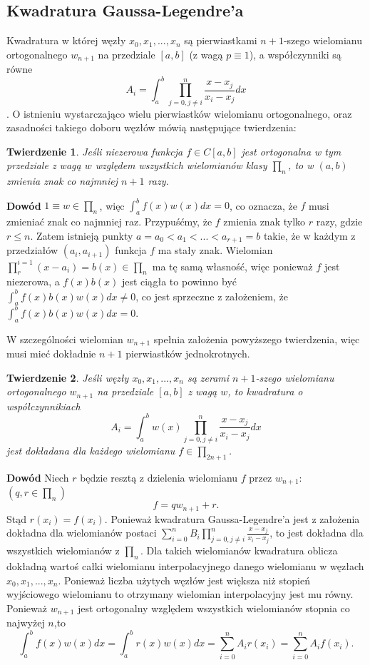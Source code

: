 \documentclass{article}
\newtheorem{theorem}{Twierdzenie}
\begin{document}
\subsection*{Kwadratura Gaussa-Legendre'a}
Kwadratura w której węzły $x_0,x_1,...,x_n$ są pierwiastkami $n+1$-szego
wielomianu ortogonalnego $w_{n+1}$ na przedziale $[a,b]$ (z wagą $p\equiv 1$), a współczynniki są równe
\[A_i=\int_a^b \prod_{j=0,j\neq i}^n \frac{x-x_j}{x_i-x_j} dx\]. O istnieniu
wystarczająco wielu pierwiastków wielomianu ortogonalnego, oraz zasadności 
takiego doboru węzłów mówią następujące twierdzenia: 
\begin{theorem}
	Jeśli niezerowa funkcja $f\in C[a,b]$ jest ortogonalna w tym przedziale z wagą $w$ względem wszystkich wielomianów klasy $\prod_{n}$, to w $(a,b)$ zmienia znak co najmniej $n+1$ razy.
\end{theorem}
\textbf{Dowód} $1\equiv w \in \prod_{n}$, więc $\int_a^b f(x)w(x)dx = 0$, co oznacza, że $f$ musi zmieniać znak co najmniej raz. Przypuśćmy, że $f$ zmienia znak tylko $r$ razy, gdzie $r\le n $. Zatem istnieją punkty $a=a_0<a_1<...<a_{r+1}=b$ takie, że w każdym z przedziałów $(a_i,a_{i+1})$ funkcja $f$ ma stały znak. Wielomian $\prod_{r}^{i=1}(x-a_i) = b(x) \in \prod_{n}$ ma tę samą własność, więc ponieważ $f$ jest niezerowa, a $f(x)b(x)$ jest ciągła to powinno być $\int_{a}^{b} f(x)b(x)w(x)dx\neq 0$, co jest sprzeczne z założeniem, że $\int_{a}^{b}f(x)b(x)w(x)dx = 0$. \newline

W szczególności wielomian $w_{n+1}$ spełnia założenia powyższego twierdzenia, więc musi mieć dokładnie $n+1$ pierwiastków jednokrotnych.

\begin{theorem}
	Jeśli węzły $x_0,x_1,...,x_n$ są zerami $n+1$-szego wielomianu ortogonalnego $w_{n+1}$ na przedziale $[a,b]$ z wagą $w$, to kwadratura o współczynnikiach
	\[A_i=\int_a^b w(x)\prod_{j=0,j\neq i}^n \frac{x-x_j}{x_i-x_j} dx\] jest dokładana dla każdego wielomianu $f\in\prod_{2n+1}$.
\end{theorem}

\textbf{Dowód} Niech $r$ będzie resztą z dzielenia wielomianu $f$ przez $w_{n+1}$: $(q,r\in \prod_{n})$\[f = qw_{n+1} + r .\] Stąd $r(x_i) = f(x_i)$. Ponieważ kwadratura Gaussa-Legendre'a jest z założenia dokładna dla wielomianów postaci $\sum_{i=0}^n B_i\prod_{j=0,j\neq i}^n \frac{x-x_j}{x_i-x_j}$, to jest dokładna dla wszystkich wielomianów z $\prod_n$. Dla takich wielomianów kwadratura oblicza dokładną wartoś całki wielomianu interpolacyjnego danego wielomianu w węzłach $x_0,x_1,...,x_n$. Ponieważ liczba użytych węzłów jest większa niż stopień wyjściowego wielomianu to otrzymany wielomian interpolacyjny jest mu równy. Ponieważ $w_{n+1}$ jest ortogonalny względem wszystkich wielomianów stopnia co najwyżej $n$,to \[\int_a^b f(x)w(x)dx = \int_a^b r(x)w(x)dx = \sum_{i=0}^n A_ir(x_i) = \sum_{i=0}^n A_if(x_i).\] 
\end{document}
